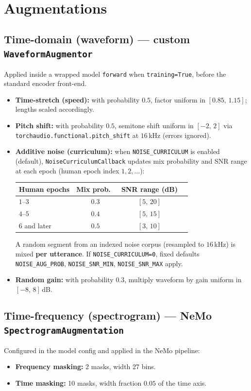 \documentclass[11pt,a4paper]{article}
\begin{document}
\section{Augmentations}
\label{sec:aug}

\subsection{Time-domain (waveform) --- custom \texttt{WaveformAugmentor}}
Applied inside a wrapped model \texttt{forward} when \texttt{training=True}, before the standard encoder front-end.

\begin{itemize}
  \item \textbf{Time-stretch (speed):} with probability $0.5$, factor uniform in $[0.85,\,1.15]$; lengths scaled accordingly.
  \item \textbf{Pitch shift:} with probability $0.5$, semitone shift uniform in $[-2,\,2]$ via \texttt{torchaudio.functional.pitch\_shift} at $16$\,kHz (errors ignored).
  \item \textbf{Additive noise (curriculum):} when \texttt{NOISE\_CURRICULUM} is enabled (default), \texttt{NoiseCurriculumCallback} updates mix probability and SNR range at each epoch (human epoch index $1,2,\ldots$):
  \begin{center}
  \begin{tabular}{@{}lccc@{}}
    \toprule
    Human epochs & Mix prob.\ & SNR range (dB) \\
    \midrule
    $1$--$3$ & $0.3$ & $[5,\,20]$ \\
    $4$--$5$ & $0.4$ & $[5,\,15]$ \\
    $6$ and later & $0.5$ & $[3,\,10]$ \\
    \bottomrule
  \end{tabular}
  \end{center}
  A random segment from an indexed noise corpus (resampled to $16$\,kHz) is mixed \textbf{per utterance}. If \texttt{NOISE\_CURRICULUM=0}, fixed defaults \texttt{NOISE\_AUG\_PROB}, \texttt{NOISE\_SNR\_MIN}, \texttt{NOISE\_SNR\_MAX} apply.
  \item \textbf{Random gain:} with probability $0.3$, multiply waveform by gain uniform in $[-8,\,8]$\,dB.
\end{itemize}

\subsection{Time-frequency (spectrogram) --- NeMo \texttt{SpectrogramAugmentation}}
Configured in the model config and applied in the NeMo pipeline:
\begin{itemize}
  \item \textbf{Frequency masking:} 2 masks, width 27 bins.
  \item \textbf{Time masking:} 10 masks, width fraction $0.05$ of the time axis.
\end{itemize}
\end{document}

